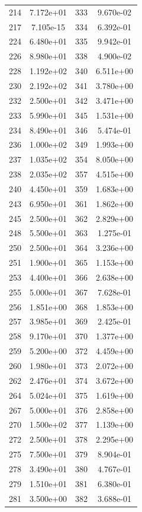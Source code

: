 \documentclass[12pt]{article}
\begin{document}
\begin{longtable}{@{}cccc@{}}
214 & 7.172e+01 & 333 & 9.670e-02 \\
217 & 7.105e-15 & 334 & 6.392e-01 \\
224 & 6.480e+01 & 335 & 9.942e-01 \\
226 & 8.980e+01 & 338 & 4.900e-02 \\
228 & 1.192e+02 & 340 & 6.511e+00 \\
230 & 2.192e+02 & 341 & 3.780e+00 \\
232 & 2.500e+01 & 342 & 3.471e+00 \\
233 & 5.990e+01 & 345 & 1.531e+00 \\
234 & 8.490e+01 & 346 & 5.474e-01 \\
236 & 1.000e+02 & 349 & 1.993e+00 \\
237 & 1.035e+02 & 354 & 8.050e+00 \\
238 & 2.035e+02 & 357 & 4.515e+00 \\
240 & 4.450e+01 & 359 & 1.683e+00 \\
243 & 6.950e+01 & 361 & 1.862e+00 \\
245 & 2.500e+01 & 362 & 2.829e+00 \\
248 & 5.500e+01 & 363 & 1.275e-01 \\
250 & 2.500e+01 & 364 & 3.236e+00 \\
251 & 1.900e+01 & 365 & 1.153e+00 \\
253 & 4.400e+01 & 366 & 2.638e+00 \\
255 & 5.000e+01 & 367 & 7.628e-01 \\
256 & 1.851e+00 & 368 & 1.853e+00 \\
257 & 3.985e+01 & 369 & 2.425e-01 \\
258 & 9.170e+01 & 370 & 1.377e+00 \\
259 & 5.200e+00 & 372 & 4.459e+00 \\
260 & 1.980e+01 & 373 & 2.072e+00 \\
262 & 2.476e+01 & 374 & 3.672e+00 \\
264 & 5.024e+01 & 375 & 1.619e+00 \\
267 & 5.000e+01 & 376 & 2.858e+00 \\
270 & 1.500e+02 & 377 & 1.139e+00 \\
272 & 2.500e+01 & 378 & 2.295e+00 \\
275 & 7.500e+01 & 379 & 8.904e-01 \\
278 & 3.490e+01 & 380 & 4.767e-01 \\
279 & 1.510e+01 & 381 & 6.380e-01 \\
281 & 3.500e+00 & 382 & 3.688e-01 \\

\end{longtable}
\end{document}

